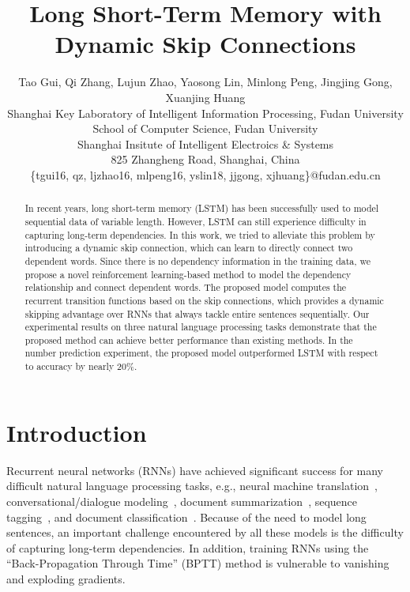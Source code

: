 \documentclass[letterpaper]{article} \usepackage{aaai19}  \usepackage{times}  \usepackage{helvet}  \usepackage{courier}  \usepackage{url}  \usepackage{graphicx}  \usepackage{amsmath}
\begin{document}
\title{Long Short-Term Memory with Dynamic Skip Connections}
\author{Tao Gui, Qi Zhang, Lujun Zhao, Yaosong Lin, Minlong Peng, Jingjing Gong, Xuanjing Huang\\
Shanghai Key Laboratory of Intelligent Information Processing, Fudan University\\
School of Computer Science, Fudan University\\
Shanghai Insitute of Intelligent Electroics \& Systems\\
825 Zhangheng Road, Shanghai, China\\
\{tgui16, qz, ljzhao16, mlpeng16, yslin18, jjgong, xjhuang\}@fudan.edu.cn
}
\maketitle
\begin{abstract}
In recent years, long short-term memory (LSTM) has been successfully used to model sequential data of variable length. However, LSTM can still experience difficulty in capturing long-term dependencies. In this work, we tried to alleviate this problem by introducing a dynamic skip connection, which can learn to directly connect two dependent words. Since there is no dependency information in the training data, we propose a novel reinforcement learning-based method to model the dependency relationship and connect dependent words. The proposed model computes the recurrent transition functions based on the skip connections, which provides a dynamic skipping advantage over RNNs that always tackle entire sentences sequentially. Our experimental results on three natural language processing tasks demonstrate that the proposed method can achieve better performance than existing methods. In the number prediction experiment, the proposed model outperformed LSTM with respect to accuracy by nearly 20\%. 
\end{abstract}

\section{Introduction}
Recurrent neural networks (RNNs) have achieved significant success for many difficult natural language processing tasks, e.g., neural machine translation~\cite{sutskever2014sequence}, conversational/dialogue modeling~\cite{serban2016building}, document summarization~\cite{nallapati2016abstractive}, sequence tagging~\cite{santos2014learning}, and document classification~\cite{dai2015semi}. Because of the need to model long sentences, an important challenge encountered by all these models is the difficulty of capturing long-term dependencies. In addition, training RNNs using the ``Back-Propagation Through Time'' (BPTT) method is vulnerable to vanishing and exploding gradients.
\end{document}
